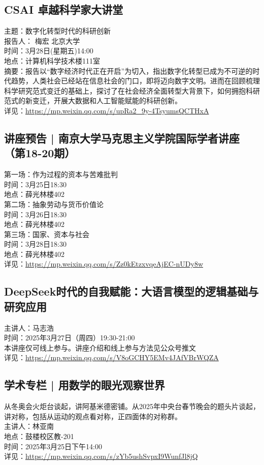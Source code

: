 \documentclass[letterpaper, 12pt]{article}
\begin{document}
\begin{multicols}{2}
\subsection{CSAI 卓越科学家大讲堂}
主题：数字化转型时代的科研创新
\\报告人： 梅宏 北京大学
\\时间：3月28日(星期五)14:00
\\地点：计算机科学技术楼111室
\\摘要：报告以“数字经济时代正在开启”为切入，指出数字化转型已成为不可逆的时代趋势，人类社会已经站在信息社会的门口，即将迈向数字文明。进而在回顾梳理科学研究范式变迁的基础上，探讨了在社会经济全面转型大背景下，如何拥抱科研范式的新变迁，开展大数据和人工智能赋能的科研创新。
\\详见：\url{https://mp.weixin.qq.com/s/upRa2_9y-4TsyumsQCTHxA}


\subsection{讲座预告 | 南京大学马克思主义学院国际学者讲座（第18-20期）}
第一场：作为过程的资本与苦难批判
\\时间：3月25日18:30
\\地点：薛光林楼402
\\第二场：抽象劳动与货币价值论
\\时间：3月26日18:30
\\地点：薛光林楼402
\\第三场：国家、资本与社会
\\时间：3月28日18:30
\\地点：薛光林楼402
\\详见：\url{https://mp.weixin.qq.com/s/Zz0kEtzxvqeAjEC-nUDy8w}

\subsection{DeepSeek时代的自我赋能：大语言模型的逻辑基础与研究应用}
主讲人：马志浩
\\时间：2025年3月27日（周四）19:30-21:00
\\本讲座仅可线上参与。讲座介绍和线上参与方法见公众号推文
\\详见：\url{https://mp.weixin.qq.com/s/V8oGCHY5EMv4JAfVBrWQZA}

\subsection{学术专栏 | 用数学的眼光观察世界}
从冬奥会火炬台谈起，讲阿基米德密铺。从2025年中央台春节晚会的题头片谈起，讲对称，包括从运动的观点看对称，正四面体的对称群。
\\主讲人：林亚南
\\地点：鼓楼校区教-201
\\时间：2025年3月25日下午14:00
\\详见：\url{https://mp.weixin.qq.com/s/zYb5ushSvpxI9WunfJl8jQ}

\end{multicols}
\end{document}
